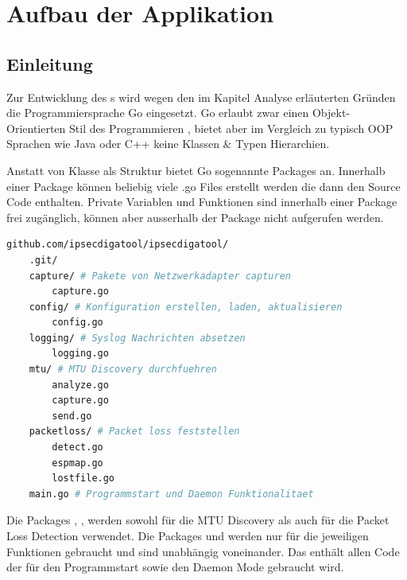 \section{Aufbau der Applikation}
\label{sec:Aufbau der Applikation}

\subsection{Einleitung}
Zur Entwicklung des \tool{}s wird wegen den im Kapitel Analyse erläuterten Gründen die Programmiersprache Go eingesetzt. Go erlaubt zwar einen Objekt-Orientierten Stil des Programmieren \cite[:240]{golang_faq}, bietet aber im Vergleich zu typisch \acs{OOP} Sprachen wie Java oder C++ keine Klassen \& Typen Hierarchien.

Anstatt von Klasse als Struktur bietet Go sogenannte Packages an. Innerhalb einer Package können beliebig viele .go Files erstellt werden die dann den Source Code enthalten. Private Variablen und Funktionen sind innerhalb einer Package frei zugänglich, können aber ausserhalb der Package nicht aufgerufen werden.

\begin{lstlisting}[language=bash, caption=Package Struktur des \tool{}]                    
github.com/ipsecdigatool/ipsecdigatool/       
	.git/
	capture/ # Pakete von Netzwerkadapter capturen        
		capture.go
	config/ # Konfiguration erstellen, laden, aktualisieren
		config.go
	logging/ # Syslog Nachrichten absetzen
		logging.go
	mtu/ # MTU Discovery durchfuehren
		analyze.go
		capture.go
		send.go
	packetloss/ # Packet loss feststellen
		detect.go
		espmap.go
		lostfile.go
	main.go # Programmstart und Daemon Funktionalitaet
\end{lstlisting}

Die Packages , ,  werden sowohl für die \acs{MTU} Discovery als auch für die Packet Loss Detection verwendet. Die Packages  und  werden nur für die jeweiligen Funktionen gebraucht und sind unabhängig voneinander. Das  enthält allen Code der für den Programmstart sowie den Daemon Mode gebraucht wird.

